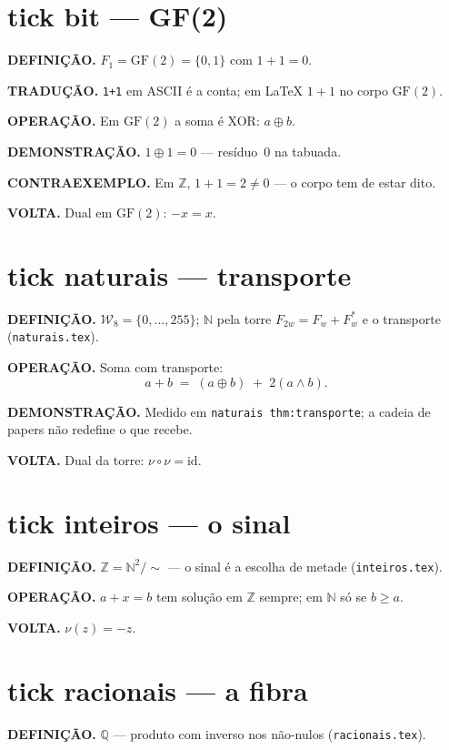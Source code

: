 \documentclass[11pt,a4paper]{article}
\newcommand{\code}[1]{\texttt{\small #1}}
\newcommand{\Word}{\mathcal{W}}
\begin{document}
\section{tick bit --- GF(2)}\label{sec:tick-bit}
\textbf{DEFINIÇÃO.} $F_1=\mathrm{GF}(2)=\{0,1\}$ com $1+1=0$.

\textbf{TRADUÇÃO.} \verb|1+1| em ASCII é a conta; em LaTeX
$1+1$ no corpo $\mathrm{GF}(2)$.

\textbf{OPERAÇÃO.} Em $\mathrm{GF}(2)$ a soma é XOR: $a\oplus b$.

\textbf{DEMONSTRAÇÃO.} $1\oplus1=0$ --- resíduo~$0$ na tabuada.

\textbf{CONTRAEXEMPLO.} Em $\mathbb{Z}$, $1+1=2\neq0$ --- o corpo tem de estar dito.

\textbf{VOLTA.} Dual em $\mathrm{GF}(2)$: $-x=x$.

\section{tick naturais --- transporte}\label{sec:tick-N}
\textbf{DEFINIÇÃO.} $\Word_8=\{0,\ldots,255\}$; $\mathbb{N}$ pela torre
$F_{2w}=F_w+F_w^{*}$ e o transporte (\code{naturais.tex}).

\textbf{OPERAÇÃO.} Soma com transporte:
\[
a+b \;=\; (a\oplus b) \;+\; 2(a\wedge b).
\]

\textbf{DEMONSTRAÇÃO.} Medido em \code{naturais thm:transporte}; a cadeia
de papers não redefine o que recebe.

\textbf{VOLTA.} Dual da torre: $\nu\circ\nu=\mathrm{id}$.

\section{tick inteiros --- o sinal}\label{sec:tick-Z}
\textbf{DEFINIÇÃO.} $\mathbb{Z}=\mathbb{N}^{2}/{\sim}$ --- o sinal é a
escolha de metade (\code{inteiros.tex}).

\textbf{OPERAÇÃO.} $a+x=b$ tem solução em $\mathbb{Z}$ sempre; em $\mathbb{N}$
só se $b\ge a$.

\textbf{VOLTA.} $\nu(z)=-z$.

\section{tick racionais --- a fibra}\label{sec:tick-Q}
\textbf{DEFINIÇÃO.} $\mathbb{Q}$ --- produto com inverso nos não-nulos
(\code{racionais.tex}).
\end{document}
